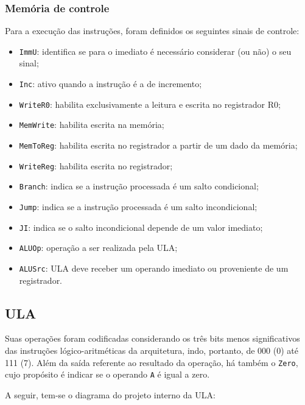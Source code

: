 \documentclass[twocolumn, 11pt]{article}
\begin{document}
\subsubsection{Memória de controle}

Para a execução das instruções, foram definidos os seguintes sinais de controle:

\begin{itemize}
    \item \texttt{ImmU}: identifica se para o imediato é necessário considerar (ou não) o seu sinal;
    \item \texttt{Inc}: ativo quando a instrução é a de incremento;
    \item \texttt{WriteR0}: habilita exclusivamente a leitura e escrita no registrador R0;
    \item \texttt{MemWrite}: habilita escrita na memória;
    \item \texttt{MemToReg}: habilita escrita no registrador a partir de um dado da memória;
    \item \texttt{WriteReg}: habilita escrita no registrador; 
    \item \texttt{Branch}: indica se a instrução processada é um salto condicional;
    \item \texttt{Jump}: indica se a instrução processada é um salto incondicional;
    \item \texttt{JI}: indica se o salto incondicional depende de um valor imediato;
    \item \texttt{ALUOp}: operação a ser realizada pela ULA; 
    \item \texttt{ALUSrc}: ULA deve receber um operando imediato ou proveniente de um registrador.
\end{itemize}

\subsection{ULA}

Suas operações foram codificadas considerando os três bits menos significativos das instruções lógico-aritméticas da arquitetura, indo, portanto, de 000 (0) até 111 (7). Além da saída referente ao resultado da operação, há também o \texttt{Zero}, cujo propósito é indicar se o operando \texttt{A} é igual a zero.

A seguir, tem-se o diagrama do projeto interno da ULA:
\end{document}
